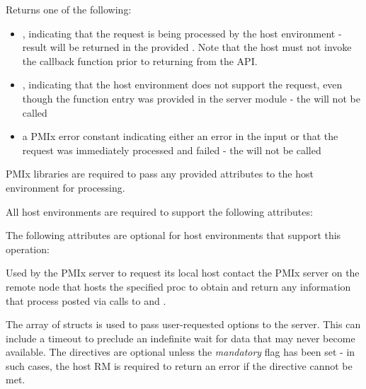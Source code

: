 \begin{arglist}
\end{arglist}

Returns one of the following:

\begin{itemize}
    \item {}, indicating that the request is being processed by the host environment - result will be returned in the provided . Note that the host must not invoke the callback function prior to returning from the \ac{API}.
    \item {}, indicating that the host environment does not support the request, even though the function entry was provided in the server module - the  will not be called
    \item a PMIx error constant indicating either an error in the input or that the request was immediately processed and failed - the  will not be called
\end{itemize}

\reqattrstart
\ac{PMIx} libraries are required to pass any provided attributes to the host environment for processing.

All host environments are required to support the following attributes:


\reqattrend

\optattrstart
The following attributes are optional for host environments that support this operation:


\optattrend

\descr

Used by the \ac{PMIx} server to request its local host contact the \ac{PMIx} server on the remote node that hosts the specified proc to obtain and return any information that process posted via calls to  and .

The array of  structs is used to pass user-requested options to the server.
This can include a timeout to preclude an indefinite wait for data that may never become available.
The directives are optional unless the \emph{mandatory} flag has been set - in such cases, the host \ac{RM} is required to return an error if the directive cannot be met.

